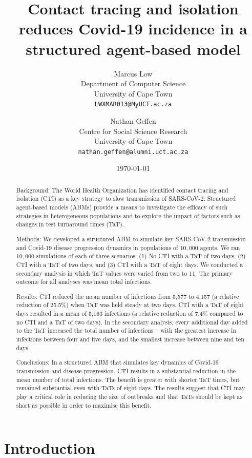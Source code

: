 \documentclass{article}
\title{Contact tracing and isolation reduces Covid-19 incidence in a structured agent-based model}
\author{
  Marcus Low \\
  Department of Computer Science \\
  University of Cape Town\\
  \texttt{LWXMAR013@MyUCT.ac.za} \\
  \and
  Nathan Geffen \\
  Centre for Social Science Research \\
  University of Cape Town\\
  \texttt{nathan.geffen@alumni.uct.ac.za}}
\date{\today}
\begin{document}
\maketitle

\begin{abstract}

Background: The World Health Organization has identified contact tracing and
isolation (CTI) as a key strategy to slow transmission of SARS-CoV-2. Structured
agent-based models (ABMs) provide a means to investigate the efficacy of such
strategies in heterogeneous populations and to explore the impact of factors
such as changes in test turnaround times (TaT).

Methods: We developed a structured ABM to simulate key SARS-CoV-2 transmission
and Covid-19 disease progression dynamics in populations of $10,000$ agents. We
ran $10,000$ simulations of each of three scenarios: (1) No CTI with a TaT of
two days, (2) CTI with a TaT of two days, and (3) CTI with a TaT of eight days. We
conducted a secondary analysis in which TaT values were varied from two to 11. The
primary outcome for all analyses was mean total infections.

Results: CTI reduced the mean number of infections from 5,577 to 4,157 (a
relative reduction of 25.5\%) when TaT was held steady at two days. CTI with a TaT
of eight days resulted in a mean of 5,163 infections (a relative reduction of 7.4\%
compared to no CTI and a TaT of two days). In the secondary analysis, every
additional day added to the TaT increased the total number of infections – with
the greatest increase in infections between four and five days, and the smallest
increase between nine and ten days.

Conclusions: In a structured ABM that simulates key dynamics of Covid-19
transmission and disease progression, CTI results in a substantial reduction in
the mean number of total infections. The benefit is greater with shorter TaT
times, but remained substantial even with TaTs of eight days. The results
suggest that CTI may play a critical role in reducing the size of outbreaks and
that TaTs should be kept as short as possible in order to maximise this benefit.

\end{abstract}


\section{Introduction}
\end{document}
